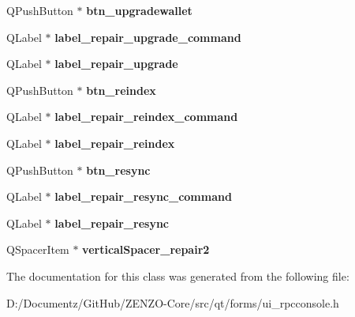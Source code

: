 \begin{DoxyCompactItemize}
Q\+Push\+Button $\ast$ {\bfseries btn\+\_\+upgradewallet}
\item 
\mbox{\label{class_ui___r_p_c_console_a916ce13ec59fd8dc254cc1e22fdc5f08}} 
Q\+Label $\ast$ {\bfseries label\+\_\+repair\+\_\+upgrade\+\_\+command}
\item 
\mbox{\label{class_ui___r_p_c_console_ab363e0015043a2e191f95c91bab54237}} 
Q\+Label $\ast$ {\bfseries label\+\_\+repair\+\_\+upgrade}
\item 
\mbox{\label{class_ui___r_p_c_console_a549d83b1f09390863dd05c3224e722cf}} 
Q\+Push\+Button $\ast$ {\bfseries btn\+\_\+reindex}
\item 
\mbox{\label{class_ui___r_p_c_console_a2e30ba35ed4d4892fb24cc5dc13fd6d8}} 
Q\+Label $\ast$ {\bfseries label\+\_\+repair\+\_\+reindex\+\_\+command}
\item 
\mbox{\label{class_ui___r_p_c_console_a0ab245471e8d082cdaa7881b72b6943f}} 
Q\+Label $\ast$ {\bfseries label\+\_\+repair\+\_\+reindex}
\item 
\mbox{\label{class_ui___r_p_c_console_a6cfeea3c3a6fb32ce838a065af52b423}} 
Q\+Push\+Button $\ast$ {\bfseries btn\+\_\+resync}
\item 
\mbox{\label{class_ui___r_p_c_console_a936150a307c2fa5be828ebd2c70db671}} 
Q\+Label $\ast$ {\bfseries label\+\_\+repair\+\_\+resync\+\_\+command}
\item 
\mbox{\label{class_ui___r_p_c_console_a6ee51cd94c448fdf87c488ec7ade2867}} 
Q\+Label $\ast$ {\bfseries label\+\_\+repair\+\_\+resync}
\item 
\mbox{\label{class_ui___r_p_c_console_ac60606609a348d73cdb60b1ad466154c}} 
Q\+Spacer\+Item $\ast$ {\bfseries vertical\+Spacer\+\_\+repair2}
\end{DoxyCompactItemize}


The documentation for this class was generated from the following file\+:\begin{DoxyCompactItemize}
\item 
D\+:/\+Documentz/\+Git\+Hub/\+Z\+E\+N\+Z\+O-\/\+Core/src/qt/forms/ui\+\_\+rpcconsole.\+h\end{DoxyCompactItemize}
